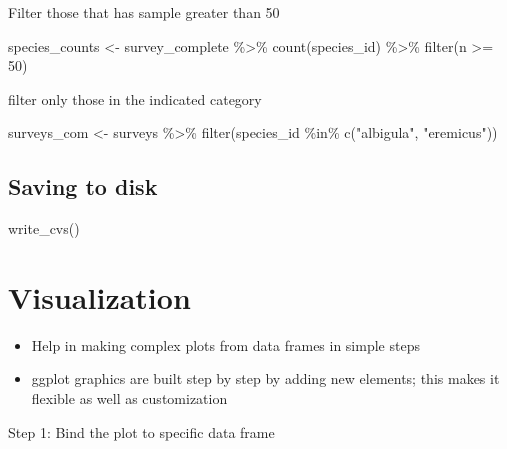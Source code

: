 \documentclass[
  letterpaper,
  DIV=11,
  numbers=noendperiod]{scrreprt}
\newenvironment{Shaded}{\begin{snugshade}}{\end{snugshade}}
\newcommand{\DecValTok}[1]{\textcolor[rgb]{0.68,0.00,0.00}{#1}}
\newcommand{\FunctionTok}[1]{\textcolor[rgb]{0.28,0.35,0.67}{#1}}
\newcommand{\NormalTok}[1]{\textcolor[rgb]{0.00,0.23,0.31}{#1}}
\newcommand{\OtherTok}[1]{\textcolor[rgb]{0.00,0.23,0.31}{#1}}
\newcommand{\SpecialCharTok}[1]{\textcolor[rgb]{0.37,0.37,0.37}{#1}}
\newcommand{\StringTok}[1]{\textcolor[rgb]{0.13,0.47,0.30}{#1}}
\providecommand{\tightlist}{%
  \setlength{\itemsep}{0pt}\setlength{\parskip}{0pt}}\usepackage{longtable,booktabs,array}
\begin{document}
Filter those that has sample greater than 50

\begin{Shaded}
\begin{Highlighting}[]
\NormalTok{species\_counts }\OtherTok{\textless{}{-}}\NormalTok{ survey\_complete }\SpecialCharTok{\%\textgreater{}\%}
  \FunctionTok{count}\NormalTok{(species\_id) }\SpecialCharTok{\%\textgreater{}\%}
  \FunctionTok{filter}\NormalTok{(n }\SpecialCharTok{\textgreater{}=} \DecValTok{50}\NormalTok{)}
\end{Highlighting}
\end{Shaded}

filter only those in the indicated category

\begin{Shaded}
\begin{Highlighting}[]
\NormalTok{surveys\_com }\OtherTok{\textless{}{-}}\NormalTok{ surveys }\SpecialCharTok{\%\textgreater{}\%}
  \FunctionTok{filter}\NormalTok{(species\_id }\SpecialCharTok{\%in\%} \FunctionTok{c}\NormalTok{(}\StringTok{"albigula"}\NormalTok{, }\StringTok{"eremicus"}\NormalTok{))}
\end{Highlighting}
\end{Shaded}

\subsection{Saving to disk}\label{saving-to-disk}

\begin{Shaded}
\begin{Highlighting}[]
\FunctionTok{write\_cvs}\NormalTok{()}
\end{Highlighting}
\end{Shaded}

\section{Visualization}\label{visualization}

\begin{itemize}
\tightlist
\item
  Help in making complex plots from data frames in simple steps
\item
  ggplot graphics are built step by step by adding new elements; this
  makes it flexible as well as customization
\end{itemize}

Step 1: Bind the plot to specific data frame
\end{document}
